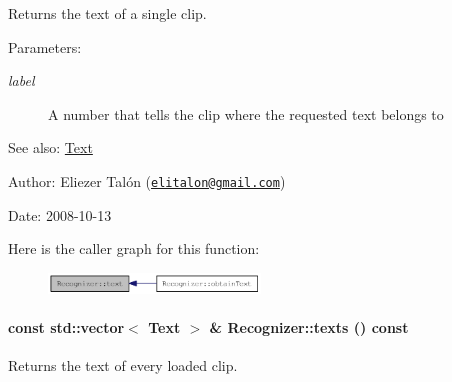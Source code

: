 Returns the text of a single clip. 

\begin{Desc}
\item[Parameters:]
\begin{description}
\item[{\em label}]A number that tells the clip where the requested text belongs to\end{description}
\end{Desc}
\begin{Desc}
\item[See also:]\hyperlink{class_text}{Text}\end{Desc}
\begin{Desc}
\item[Author:]Eliezer Talón (\href{mailto:elitalon@gmail.com}{\tt elitalon@gmail.com}) \end{Desc}
\begin{Desc}
\item[Date:]2008-10-13 \end{Desc}


Here is the caller graph for this function:\nopagebreak
\begin{figure}[H]
\begin{center}
\leavevmode
\includegraphics[width=160pt]{class_recognizer_c5d20b511888a60a6c1a81c0a4206ec2_icgraph}
\end{center}
\end{figure}
\hypertarget{class_recognizer_2a365c34f1447cdc3311d311e02bf2ed}{
\paragraph[{texts}]{\setlength{\rightskip}{0pt plus 5cm}const std::vector$<$ {\bf Text} $>$ \& Recognizer::texts () const}\hfill}
\label{class_recognizer_2a365c34f1447cdc3311d311e02bf2ed}


Returns the text of every loaded clip. 

